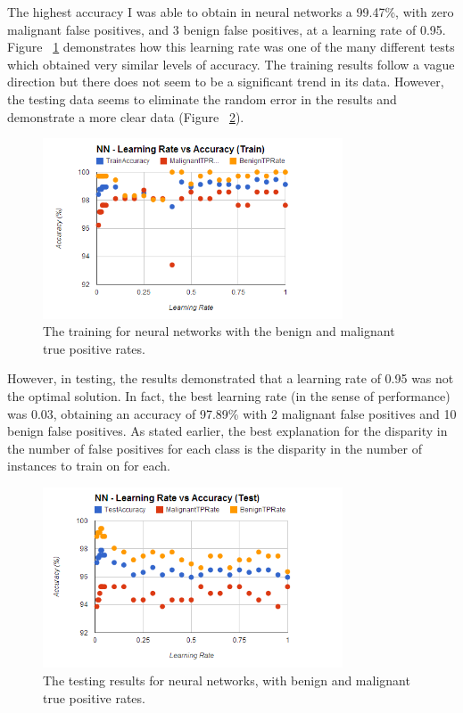 \documentclass[annual]{acmsiggraph}
\begin{document}
The highest accuracy I was able to obtain in neural networks a 99.47\%, with zero malignant false positives,
and 3 benign false positives, at a learning rate of 0.95. Figure ~\ref{fig:nn1d1} demonstrates how this learning
rate was one of the many different tests which obtained very similar levels of accuracy. The training results
follow a vague direction but there does not seem to be a significant trend in its data. However, the testing data
seems to eliminate the random error in the results and demonstrate a more clear data (Figure ~\ref{fig:nn2d1}).

\begin{figure}[ht]
  \centering
  \includegraphics[width=3.5in]{charts/chart_3_nn_d1.png}
  \caption{The training for neural networks with the benign and malignant true positive rates. }
  \label{fig:nn1d1}
\end{figure}

However, in testing, the results demonstrated that a learning rate of 0.95 was not the optimal solution. In fact,
the best learning rate (in the sense of performance) was 0.03, obtaining an accuracy of 97.89\% with 2 malignant
false positives and 10 benign false positives. As stated earlier, the best explanation for the disparity in the number
of false positives for each class is the disparity in the number of instances to train on for each.

\begin{figure}[ht]
  \centering
  \includegraphics[width=3.5in]{charts/chart_1_nn_d1.png}
  \caption{The testing results for neural networks, with benign and malignant true positive rates. }
  \label{fig:nn2d1}
\end{figure}
\end{document}
